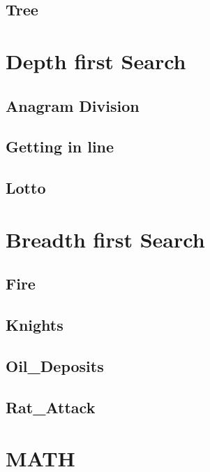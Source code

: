     \subsection{Tree}
        

\section{Depth first Search}
    \subsection{Anagram Division}
            
    \subsection{Getting in line}
            
    \subsection{Lotto}
            

\section{Breadth first Search}
    \subsection{Fire}
            
    \subsection{Knights}
            
    \subsection{Oil_Deposits}
            
    \subsection{Rat_Attack}
            

\section{MATH}
